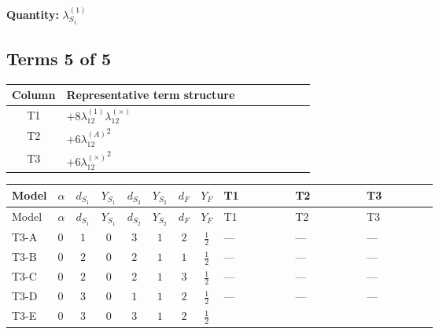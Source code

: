 \documentclass[8pt]{article}
\begin{document}
\begin{landscape}
\begin{longtable}{@{}llcccccc >{\raggedright\arraybackslash}p{0.21\linewidth} >{\raggedright\arraybackslash}p{0.21\linewidth} >{\raggedright\arraybackslash}p{0.21\linewidth}@{}}
\midrule
\bottomrule
\end{longtable}
\clearpage
\noindent\textbf{Quantity: }$\lambda_{S_1}^{(1)}$\par\smallskip
\subsection*{Terms 5 of 5}
\begin{center}
\begin{tabular}{@{}c >{\raggedright\arraybackslash}p{0.82\linewidth}@{}}
\toprule
Column & Representative term structure \\
\midrule
T1 & \(\displaystyle +8 {\lambda_{12}^{(1)}} {\lambda_{12}^{(\times)}}\) \\
\midrule
T2 & \(\displaystyle +6 {\lambda_{12}^{(A)}}^2\) \\
\midrule
T3 & \(\displaystyle +6 {\lambda_{12}^{(\times)}}^2\) \\
\midrule
\bottomrule
\end{tabular}
\end{center}
\smallskip
\tiny
\begin{longtable}{@{}llcccccc >{\raggedright\arraybackslash}p{0.21\linewidth} >{\raggedright\arraybackslash}p{0.21\linewidth} >{\raggedright\arraybackslash}p{0.21\linewidth}@{}}
\toprule
Model & $\alpha$ & $d_{S_1}$ & $Y_{S_1}$ & $d_{S_2}$ & $Y_{S_2}$ & $d_F$ & $Y_F$ & T1 & T2 & T3 \\
\midrule
\endfirsthead
\toprule
Model & $\alpha$ & $d_{S_1}$ & $Y_{S_1}$ & $d_{S_2}$ & $Y_{S_2}$ & $d_F$ & $Y_F$ & T1 & T2 & T3 \\
\midrule
\endhead
T3-A & $0$ & $1$ & $0$ & $3$ & $1$ & $2$ & $\frac{1}{2}$ & --- & --- & --- \\
\midrule
T3-B & $0$ & $2$ & $0$ & $2$ & $1$ & $1$ & $\frac{1}{2}$ & --- & --- & --- \\
\midrule
T3-C & $0$ & $2$ & $0$ & $2$ & $1$ & $3$ & $\frac{1}{2}$ & --- & --- & --- \\
\midrule
T3-D & $0$ & $3$ & $0$ & $1$ & $1$ & $2$ & $\frac{1}{2}$ & --- & --- & --- \\
\midrule
T3-E & $0$ & $3$ & $0$ & $3$ & $1$ & $2$ & $\frac{1}{2}$ & \scriptsize\adjustbox{max width=\linewidth}{$\begin{gathered} +8 {\lambda_{12}^{(1)}} {\lambda_{12}^{(\times)}}\end{gathered}$} & \scriptsize\adjustbox{max width=\linewidth}{$\begin{gathered} +6 {\lambda_{12}^{(A)}}^2\end{gathered}$} & \scriptsize\adjustbox{max width=\linewidth}{$\begin{gathered} +6 {\lambda_{12}^{(\times)}}^2\end{gathered}$} \\
\midrule
\bottomrule
\end{longtable}
\clearpage

\end{landscape}
\end{document}
